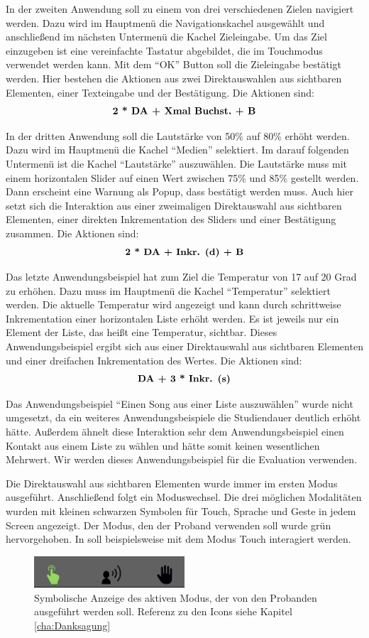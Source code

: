 In der zweiten Anwendung soll zu einem von drei verschiedenen Zielen navigiert werden. 
Dazu wird im Hauptmenü die Navigationskachel ausgewählt und anschließend im nächsten Untermenü die Kachel Zieleingabe. 
Um das Ziel einzugeben ist eine vereinfachte Tastatur abgebildet, die im Touchmodus verwendet werden kann. 
Mit dem "`OK"' Button soll die Zieleingabe bestätigt werden. 
Hier bestehen die Aktionen aus zwei Direktauswahlen aus sichtbaren Elementen, einer Texteingabe und der Bestätigung. 
Die Aktionen sind:
$$\textbf{2 * \text{DA} + \text{Xmal Buchst.} + \text{B}}$$

In der dritten Anwendung soll die Lautstärke von 50\% auf 80\% erhöht werden. 
Dazu wird im Hauptmenü die Kachel "`Medien"' selektiert. 
Im darauf folgenden Untermenü ist die Kachel "`Lautstärke"' auszuwählen. 
Die Lautstärke muss mit einem horizontalen Slider auf einen Wert zwischen 75\% und 85\% gestellt werden. 
Dann erscheint eine Warnung als Popup, dass bestätigt werden muss. 
Auch hier setzt sich die Interaktion aus einer zweimaligen Direktauswahl aus sichtbaren Elementen, einer direkten Inkrementation des Sliders und einer Bestätigung zusammen.
Die Aktionen sind:
$$\textbf{2 * \text{DA} + \text{Inkr. (d)} + \text{B}}$$

Das letzte Anwendungsbeispiel hat zum Ziel die Temperatur von 17 auf 20 Grad zu erhöhen. 
Dazu muss im Hauptmenü die Kachel "`Temperatur"' selektiert werden. 
Die aktuelle Temperatur wird angezeigt und kann durch schrittweise Inkrementation einer horizontalen Liste erhöht werden.
Es ist jeweils nur ein Element der Liste, das heißt eine Temperatur, sichtbar.
Dieses Anwendungsbeispiel ergibt sich aus einer Direktauswahl aus sichtbaren Elementen und einer dreifachen Inkrementation des Wertes. 
Die Aktionen sind:
$$\textbf{\text{DA} + 3 * \text{Inkr. (s)}}$$

Das Anwendungsbeispiel "`Einen Song aus einer Liste auszuwählen"' wurde nicht umgesetzt, da ein weiteres  Anwendungsbeispiele die Studiendauer deutlich erhöht hätte. 
Außerdem ähnelt diese Interaktion sehr dem Anwendungsbeispiel einen Kontakt aus einem Liste zu wählen und hätte somit keinen wesentlichen Mehrwert. 
Wir werden dieses Anwendungsbeispiel für die Evaluation verwenden.

Die Direktauswahl aus sichtbaren Elementen wurde immer im ersten Modus ausgeführt.
Anschließend folgt ein Moduswechsel. 
Die drei möglichen Modalitäten wurden mit kleinen schwarzen Symbolen für Touch, Sprache und Geste in jedem Screen angezeigt. 
Der Modus, den der Proband verwenden soll wurde grün hervorgehoben. 
In  soll beispielsweise mit dem Modus Touch interagiert werden. 
\begin{figure}[ht]
  \centering
  \includegraphics[width=0.5\textwidth]{img/ModusAktiv.jpg}
  \caption[Symbolische Anzeige des aktiven Modus]{Symbolische Anzeige des aktiven Modus, der von den Probanden ausgeführt werden soll. Referenz zu den Icons siehe Kapitel \ref{cha:Danksagung}}
  \label{fig:ModusAktiv}
\end{figure}

